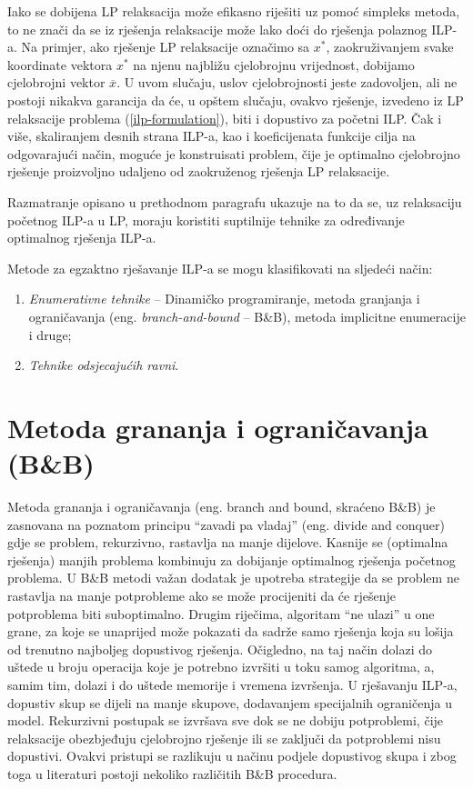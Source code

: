 \documentclass[a4paper, utf8, 11pt, colorlinks]{book}
\theoremstyle{definition}
\begin{document}
Iako se dobijena  LP relaksacija može efikasno riješiti uz pomoć simpleks metoda, to ne znači da se iz rješenja relaksacije može lako doći do rješenja polaznog ILP-a. Na primjer, ako rješenje LP relaksacije označimo sa $x^*$, zaokruživanjem svake koordinate vektora $x^*$ na njenu najbližu cjelobrojnu vrijednost, dobijamo cjelobrojni vektor  $\overline{x}$.  U uvom slučaju, uslov cjelobrojnosti jeste zadovoljen, ali ne postoji nikakva garancija da će, u opštem slučaju,  ovakvo rješenje, izvedeno iz LP relaksacije problema (\ref{ilp-formulation}), biti i  dopustivo za početni ILP. Čak i više, skaliranjem desnih strana ILP-a, kao i koeficijenata funkcije cilja na odgovarajući način, moguće je konstruisati problem, čije je optimalno cjelobrojno rješenje proizvoljno udaljeno od zaokruženog rješenja LP relaksacije. 
 
 Razmatranje opisano u prethodnom paragrafu ukazuje na to da se, uz relaksaciju početnog ILP-a u LP, moraju koristiti suptilnije tehnike za određivanje optimalnog rješenja ILP-a. 
 
Metode za egzaktno rješavanje ILP-a se mogu klasifikovati na sljedeći način:
 \begin{enumerate}
     \item \emph{Enumerativne tehnike} -- Dinamičko programiranje, metoda granjanja i ograničavanja (eng. \emph{branch-and-bound} -- B\&B), metoda implicitne enumeracije i druge;
     \item \emph{Tehnike odsjecajućih ravni}.
 \end{enumerate}


\section{Metoda grananja i ograničavanja (B\&B)}\label{sec:bb}
Metoda grananja i ograničavanja (eng. branch and bound, skraćeno B\&B) je zasnovana na poznatom principu ``zavadi pa vladaj'' (eng. divide and conquer) gdje se problem, rekurzivno, rastavlja na manje dijelove. Kasnije se (optimalna rješenja) manjih problema kombinuju za dobijanje optimalnog rješenja početnog problema.  U B\&B metodi važan dodatak je upotreba strategije da se 
problem ne rastavlja na manje potprobleme ako se može procijeniti da će rješenje potproblema biti suboptimalno. Drugim riječima, algoritam ``ne ulazi'' u one grane, za koje se unaprijed može pokazati da sadrže samo  rješenja koja su lošija od trenutno najboljeg dopustivog rješenja. Očigledno, na taj način dolazi do uštede u broju operacija koje je potrebno izvršiti u toku samog algoritma, a, samim tim, dolazi i do uštede memorije i vremena izvršenja. U rješavanju ILP-a, dopustiv skup se dijeli na manje skupove, dodavanjem specijalnih ograničenja u model. Rekurzivni postupak se izvršava sve  dok se ne dobiju potproblemi, čije relaksacije obezbjeđuju cjelobrojno rješenje ili se zaključi da potproblemi nisu dopustivi. Ovakvi pristupi se razlikuju u načinu podjele dopustivog skupa i zbog toga  u literaturi  postoji nekoliko različitih B\&B procedura. 
\end{document}

